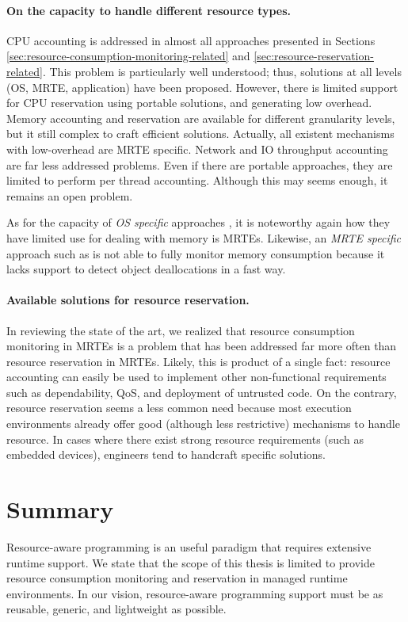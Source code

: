 \paragraph{On the capacity to handle different resource types.}
CPU accounting is addressed in almost all approaches presented in Sections \ref{sec:resource-consumption-monitoring-related} and \ref{sec:resource-reservation-related}.
This problem is particularly well understood; thus, solutions at all levels (OS, MRTE, application) have been proposed.
However, there is limited support for CPU reservation using portable solutions, and generating low overhead.
Memory accounting and reservation are available for different granularity levels, but it still complex to craft efficient solutions.
Actually, all existent mechanisms with low-overhead are MRTE specific.
Network and IO throughput accounting are far less addressed problems.
Even if there are portable approaches, they are limited to perform per thread accounting.
Although this may seems enough, it remains an open problem.

As for the capacity of \textit{OS specific} approaches \cite{Banga:1999:RCN:296806.296810,Kamp00jails:confining, Soltesz:2007:COS:1272998.1273025}, it is noteworthy again how they have limited use for dealing with memory is MRTEs.
Likewise, an \textit{MRTE specific} approach such as \cite{Lengauer:2015:AEO:2668930.2688037} is not able to fully monitor memory consumption because it lacks support to detect object deallocations in a fast way.

\paragraph{Available solutions for resource reservation.}
In reviewing the state of the art, we realized that resource consumption monitoring in MRTEs is a problem that has been addressed far more often than resource reservation in MRTEs.
Likely, this is product of a single fact: resource accounting can easily be used to implement other non-functional requirements such as dependability, QoS, and deployment of untrusted code.
On the contrary, resource reservation seems a less common need because most execution environments already offer good (although less restrictive) mechanisms to handle resource.
In cases where there exist strong resource requirements (such as embedded devices), engineers tend to handcraft specific solutions.


\section{Summary}
Resource-aware programming is an useful paradigm that requires extensive runtime support.
We state that the scope of this thesis is limited to provide resource consumption monitoring and reservation in managed runtime environments.
In our vision, resource-aware programming support must be as reusable, generic, and lightweight as possible.

